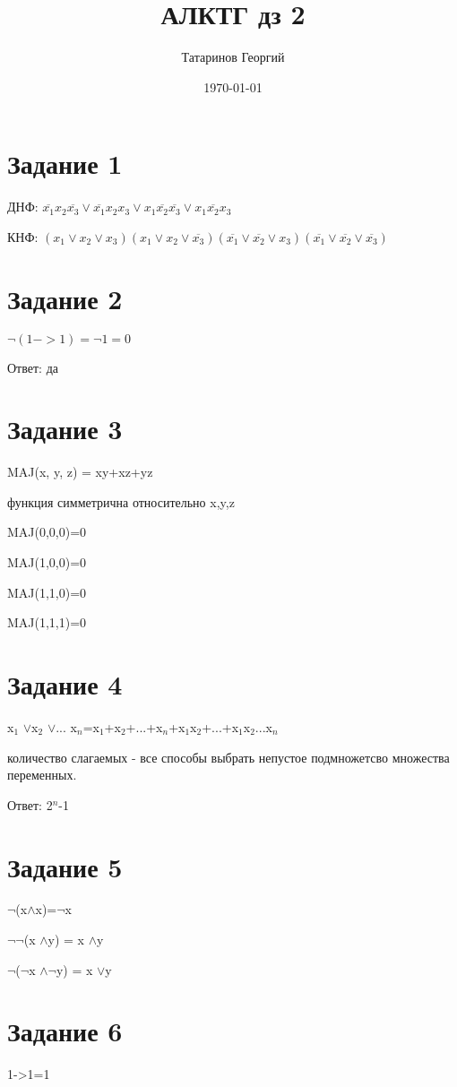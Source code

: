 \documentclass[a4paper, 12pt]{article}
\title{АЛКТГ дз 2}
\author{Татаринов Георгий}
\date{\today}
\newcommand{\dand}{$\land$}
\newcommand{\dor}{$\lor$}
\newcommand{\dnot}{$\neg$}
\begin{document}
	\maketitle
	\section*{Задание 1}

		ДНФ: $ \overline{x_1} x_2 \overline{x_3} \vee \overline{x_1} x_2 x_3 \vee x_1 \overline{x_2} \overline{x_3} \vee x_1 \overline{x_2} x_3$

		КНФ: $ (x_1 \vee x_2 \vee x_3)(x_1 \vee x_2 \vee \overline{x_3})(\overline{x_1} \vee \overline{x_2} \vee x_3)(\overline{x_1} \vee \overline{x_2} \vee \overline{x_3})$

	\section*{Задание 2}
		$\neg (1->1)=\neg 1 =0$

		Ответ: да
	\section*{Задание 3}
		MAJ(x, y, z) = xy+xz+yz

		функция симметрична относительно x,y,z

		MAJ(0,0,0)=0

		MAJ(1,0,0)=0

		MAJ(1,1,0)=0

		MAJ(1,1,1)=0
	\section*{Задание 4}
		x$_1$ \dor x$_2$ \dor ... x$_n$=x$_1$+x$_2$+...+x$_n$+x$_1$x$_2$+...+x$_1$x$_2$...x$_n$

		количество слагаемых - все способы выбрать непустое подмножетсво множества переменных.

		Ответ: 2$^n$-1
	\section*{Задание 5}
		\dnot(x\dand x)=\dnot x

		\dnot \dnot(x \dand y) = x \dand y

		\dnot (\dnot x \dand \dnot y) = x \dor y
	\section*{Задание 6}
		1->1=1
\end{document}
